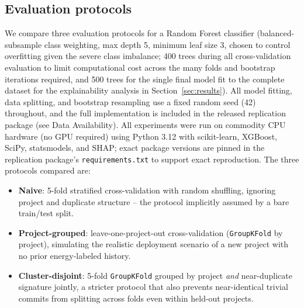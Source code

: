 \documentclass[preprint,12pt]{elsarticle}
\begin{document}
\subsection{Evaluation protocols}
We compare three evaluation protocols for a Random Forest classifier (balanced-subsample class weighting, max depth 5, minimum leaf size 3, chosen to control overfitting given the severe class imbalance; 400 trees during all cross-validation evaluation to limit computational cost across the many folds and bootstrap iterations required, and 500 trees for the single final model fit to the complete dataset for the explainability analysis in Section~\ref{sec:results}). All model fitting, data splitting, and bootstrap resampling use a fixed random seed (42) throughout, and the full implementation is included in the released replication package (see Data Availability). All experiments were run on commodity CPU hardware (no GPU required) using Python 3.12 with scikit-learn, XGBoost, SciPy, statsmodels, and SHAP; exact package versions are pinned in the replication package's \texttt{requirements.txt} to support exact reproduction. The three protocols compared are:
\begin{itemize}
\item \textbf{Naive}: 5-fold stratified cross-validation with random shuffling, ignoring project and duplicate structure -- the protocol implicitly assumed by a bare train/test split.
\item \textbf{Project-grouped}: leave-one-project-out cross-validation (\texttt{GroupKFold} by project), simulating the realistic deployment scenario of a new project with no prior energy-labeled history.
\item \textbf{Cluster-disjoint}: 5-fold \texttt{GroupKFold} grouped by project \emph{and} near-duplicate signature jointly, a stricter protocol that also prevents near-identical trivial commits from splitting across folds even within held-out projects.
\end{itemize}
\end{document}

